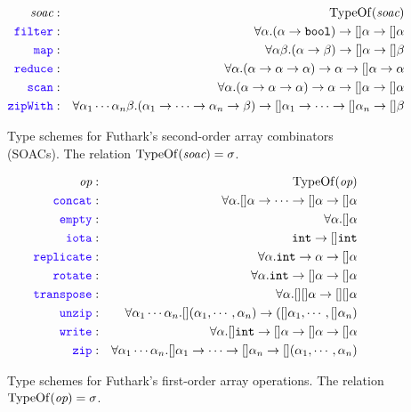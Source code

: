 \documentclass[oneside,11pt]{book}
\begin{document}
\begin{figure}
  \begin{eqnarray*}
\id{soac} & : & \mathrm{TypeOf}(\id{soac}) \\
    \fop{filter} & : & \forall \alpha. (\alpha \rarr \mathtt{bool}) \rarr []\alpha \rarr []\alpha\\
    \fop{map} & : & \forall \alpha\beta. (\alpha \rarr \beta) \rarr []\alpha \rarr []\beta\\
    \fop{reduce} & : & \forall \alpha. (\alpha \rarr \alpha \rarr \alpha) \rarr \alpha \rarr []\alpha \rarr \alpha\\
    \fop{scan} & : & \forall \alpha. (\alpha \rarr \alpha \rarr \alpha) \rarr \alpha \rarr []\alpha \rarr []\alpha\\
    \fop{zipWith} & : & \forall \alpha_1\cdots\alpha_n\beta. (\alpha_1\rarr\cdots\rarr\alpha_n \rarr \beta) \rarr []\alpha_1 \rarr\cdots\rarr []\alpha_n \rarr []\beta
  \end{eqnarray*}
  \caption{Type schemes for Futhark's second-order array combinators (SOACs). The relation $\mathrm{TypeOf}(\mbox{\it{soac}}) = \sigma$.}
  \label{fig:soactypeschemes}
\end{figure}

\begin{figure}
  \begin{eqnarray*}
\id{op} & : & \mathrm{TypeOf}(\id{op}) \\
    \fop{concat} & : & \forall \alpha. []\alpha \rarr \cdots \rarr []\alpha \rarr []\alpha \\
    \fop{empty} & : & \forall \alpha. []\alpha \\
    \fop{iota} & : & \kw{int} \rarr []\kw{int} \\
    \fop{replicate} & : & \forall \alpha. \kw{int} \rarr \alpha \rarr []\alpha\\
    \fop{rotate} & : & \forall \alpha. \kw{int} \rarr []\alpha \rarr []\alpha\\
    \fop{transpose} & : & \forall \alpha. [][]\alpha \rarr [][]\alpha\\
    \fop{unzip} & : & \forall \alpha_1\cdots\alpha_n. [](\alpha_1,\cdots,\alpha_n) \rarr ([]\alpha_1,\cdots,[]\alpha_n) \\
    \fop{write} & : & \forall \alpha. []\kw{int} \rarr []\alpha \rarr []\alpha \rarr []\alpha \\
    \fop{zip} & : & \forall \alpha_1\cdots\alpha_n. []\alpha_1\rarr\cdots\rarr[]\alpha_n \rarr [](\alpha_1,\cdots,\alpha_n)
  \end{eqnarray*}
  \caption{Type schemes for Futhark's first-order array operations. The relation $\mathrm{TypeOf}(\mbox{\it{op}}) = \sigma$.}
  \label{fig:foactypeschemes}
\end{figure}
\end{document}
